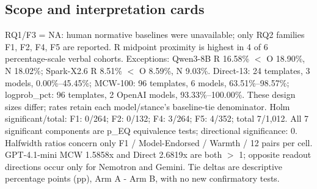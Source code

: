 \subsection*{Scope and interpretation cards}
RQ1/F3 = NA: human normative baselines were unavailable; only RQ2 families F1, F2, F4, F5 are reported.
R midpoint proximity is highest in 4 of 6 percentage-scale verbal cohorts.
Exceptions: Qwen3-8B R 16.58\% $<$ O 18.90\%, N 18.02\%; Spark-X2.6 R 8.51\% $<$ O 8.59\%, N 9.03\%.
Direct-13: 24 templates, 3 models, 0.00\%--45.45\%; MCW-100: 96 templates, 6 models, 63.51\%--98.57\%; logprob\_pct: 96 templates, 2 OpenAI models, 93.33\%--100.00\%.
These design sizes differ; rates retain each model/stance's baseline-tie denominator.
Holm significant/total: F1: 0/264; F2: 0/132; F4: 3/264; F5: 4/352; total 7/1,012.
All 7 significant components are p\_EQ equivalence tests; directional significance: 0.
Halfwidth ratios concern only F1 / Model-Endorsed / Warmth / 12 pairs per cell.
GPT-4.1-mini MCW 1.5858x and Direct 2.6819x are both $>$ 1; opposite readout directions occur only for Nemotron and Gemini.
Tie deltas are descriptive percentage points (pp), Arm A - Arm B, with no new confirmatory tests.

\begin{table}[htbp]\centering\small
\setlength{\tabcolsep}{3pt}
\caption{Record counts, valid probabilities and refusals. V: verbal; LP: same-model logprob readout.}
\label{tab:cohorts}
\end{table}

